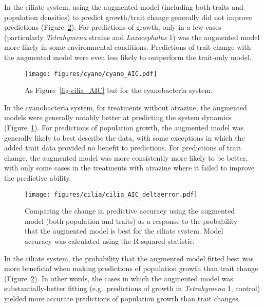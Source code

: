 \documentclass[
  letterpaper,
  DIV=11,
  numbers=noendperiod]{scrartcl}
\begin{document}
In the ciliate system, using the augmented model (including both traits
and population densities) to predict growth/trait change generally did
not improve predictions (Figure~\ref{fig-cilia_AIC_deltaerror}). For
predictions of growth, only in a few cases (particularly
\emph{Tetrahymena} strains and \emph{Loxocephalus} 1) was the augmented
model more likely in some environmental conditions. Predictions of trait
change with the augmented model were even less likely to outperform the
trait-only model.

\begin{figure}

{\centering \texttt{[image: figures/cyano/cyano\_AIC.pdf]}

}

\caption{\label{fig-cyano_AIC}As Figure~\ref{fig-cilia_AIC} but for the
cyanobacteria system.}

\end{figure}

In the cyanobacteria system, for treatments without atrazine, the
augmented models were generally notably better at predicting the system
dynamics (Figure~\ref{fig-cyano_AIC}). For predictions of population
growth, the augmented model was generally likely to best describe the
data, with some exceptions in which the added trait data provided no
benefit to predictions. For predictions of trait change, the augmented
model was more consistently more likely to be better, with only some
cases in the treatments with atrazine where it failed to improve the
predictive ability.

\begin{figure}

{\centering \texttt{[image: figures/cilia/cilia\_AIC\_deltaerror.pdf]}

}

\caption{\label{fig-cilia_AIC_deltaerror}Comparing the change in
predictive accuracy using the augmented model (both population and
traits) as a response to the probability that the augmented model is
best for the ciliate system. Model accuracy was calculated using the
R-squared statistic.}

\end{figure}

In the ciliate system, the probability that the augmented model fitted
best was more beneficial when making predictions of population growth
than trait change (Figure~\ref{fig-cilia_AIC_deltaerror}). In other
words, the cases in which the augmented model was substantially-better
fitting (e.g.~predictions of growth in \emph{Tetrahymena} 1, control)
yielded more accurate predictions of population growth than trait
changes.
\end{document}
